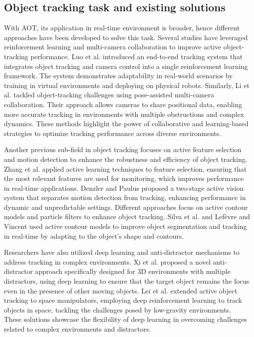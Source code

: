 \documentclass[sigconf]{aamas}
\begin{document}
\subsection{Object tracking task and existing solutions}
With AOT, its application in real-time environment is broader, hence different approaches have been developed to solve this task. Several studies have leveraged reinforcement learning and multi-camera collaboration to improve active object-tracking performance. Luo et al. \cite{luo2019end} introduced an end-to-end tracking system that integrates object tracking and camera control into a single reinforcement learning framework. The system demonstrates adaptability in real-world scenarios by training in virtual environments and deploying on physical robots. Similarly, Li et al. \cite{li2020pose} tackled object-tracking challenges using pose-assisted multi-camera collaboration. Their approach allows cameras to share positional data, enabling more accurate tracking in environments with multiple obstructions and complex dynamics. These methods highlight the power of collaborative and learning-based strategies to optimize tracking performance across diverse environments.

Another previous sub-field in object tracking focuses on active feature selection and motion detection to enhance the robustness and efficiency of object tracking. Zhang et al. \cite{zhang2013robust} applied active learning techniques to feature selection, ensuring that the most relevant features are used for monitoring, which improves performance in real-time applications. Denzler and Paulus \cite{denzler1994active} proposed a two-stage active vision system that separates motion detection from tracking, enhancing performance in dynamic and unpredictable settings. Different approaches focus on active contour models and particle filters to enhance object tracking. Silva et al. \cite{silva2016object} and Lefèvre and Vincent \cite{lefevre2004real} used active contour models to improve object segmentation and tracking in real-time by adapting to the object's shape and contours.

Researchers have also utilized deep learning and anti-distractor mechanisms to address tracking in complex environments. Xi et al. \cite{xi2021anti} proposed a novel anti-distractor approach specifically designed for 3D environments with multiple distractors, using deep learning to ensure that the target object remains the focus even in the presence of other moving objects. Lei et al. \cite{lei2022active} extended active object tracking to space manipulators, employing deep reinforcement learning to track objects in space, tackling the challenges posed by low-gravity environments. These solutions showcase the flexibility of deep learning in overcoming challenges related to complex environments and distractors.
\end{document}
